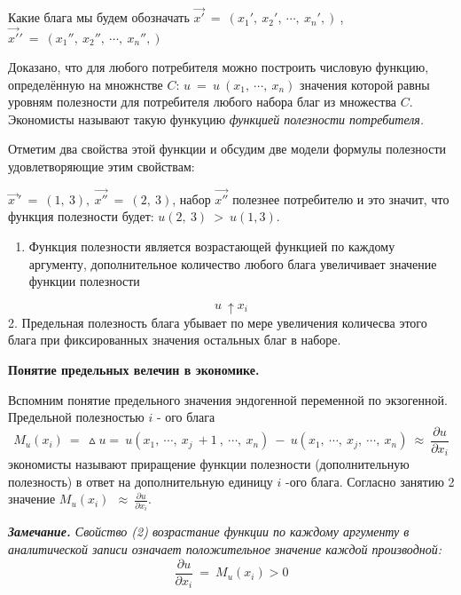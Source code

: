 \documentclass[12pt,a4paper]{article}
\begin{document}
Какие блага мы будем обозначать $\displaystyle \overrightarrow{x'} \ =\ ( x_{1} ',\ x_{2} ',\ \cdots ,\ x_{n} ',) \ $, $\displaystyle \overrightarrow{x'} '\ =\ ( x_{1} '',\ x_{2} '',\ \cdots ,\ x_{n} '',) \ $



	Доказано, что для любого потребителя можно построить числовую функцию, определённую на множнстве $\displaystyle C$: $\displaystyle u\ =\ u\ ( x_{1} ,\ \cdots ,\ x_{n})$ значения которой равны уровням полезности для потребителя любого набора благ из множества $\displaystyle C$. Экономисты называют такую функуцию \textit{функцией полезности потребителя. }

	Отметим два свойства этой функции и обсудим две модели формулы полезности удовлетворяющие этим свойствам:

$\displaystyle \overrightarrow{x\ } '\ =\ ( 1,\ 3) ,\ \overrightarrow{x''} \ =\ ( 2,\ 3)$, набор $\displaystyle \overrightarrow{x''}$ полезнее потребителю и это значит, что функция полезности будет: $\displaystyle u( 2,\ 3) \  >\ u( 1,3) .$
\begin{enumerate}
\item Функция полезности является возрастающей функцией по каждому аргументу, дополнительное количество любого блага увеличивает значение функции полезности
\end{enumerate}
\begin{equation}
u\ \uparrow x_{i}
\end{equation}
 	2. Предельная полезность блага убывает по мере увеличения количесва этого блага при фиксированных значения остальных благ в наборе.
\begin{center}
\textbf{Понятие предельных велечин в экономике.}
\end{center}
	Вспомним понятие предельного значения эндогенной переменной по экзогенной. Предельной полезностью $\displaystyle i$ - ого блага 
\begin{equation}
M_{u}( x_{i}) \ =\ \vartriangle u=\ u( x_{1} ,\ \cdots ,\ x_{j} \ +1\ ,\ \cdots ,\ x_{n}) \ -\ u( x_{1} ,\ \cdots ,\ x_{j} ,\ \cdots ,\ x_{n}) \ \approx \ \frac{\partial u}{\partial x_{i}}
\end{equation}
экономисты называют приращение функции полезности (дополнительную полезность) в ответ на дополнительную единицу $\displaystyle i$ -ого блага. Согласно занятию 2 значение $\displaystyle M_{u}( x_{i}) \ \ \approx \ \frac{\partial u}{\partial x_{i}}$.

	\textit{\textbf{Замечание. }Свойство (2) возрастание функции по каждому аргументу в аналитической записи означает положительное значение каждой производной: }
\begin{equation}
\frac{\partial u}{\partial x_{i}} \ =\ M_{u}( x_{i})  >0
\end{equation}
\end{document}
